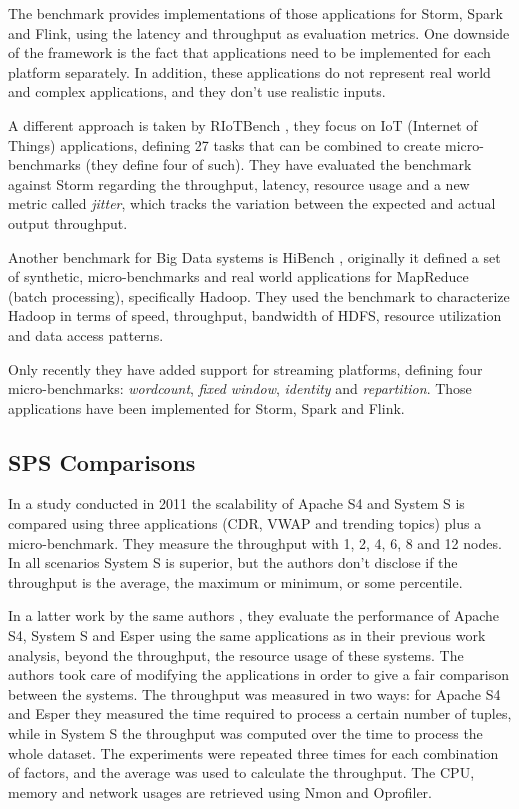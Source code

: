 \documentclass[ppgc,diss,english]{iiufrgs}
\begin{document}
The benchmark provides implementations of those applications for Storm, Spark and Flink, using the latency and throughput as evaluation metrics. One downside of the framework is the fact that applications need to be implemented for each platform separately. In addition, these applications do not represent real world and complex applications, and they don't use realistic inputs.



A different approach is taken by RIoTBench \cite{shukla2017riotbench}, they focus on IoT (Internet of Things) applications, defining 27 tasks that can be combined to create micro-benchmarks (they define four of such). They have evaluated the benchmark against Storm regarding the throughput, latency, resource usage and a new metric called \textit{jitter}, which tracks the variation between the expected and actual output throughput.



Another benchmark for Big Data systems is HiBench \cite{huang2010hibench}, originally it defined a set of synthetic, micro-benchmarks and real world applications for MapReduce (batch processing), specifically Hadoop. They used the benchmark to characterize Hadoop in terms of speed, throughput, bandwidth of HDFS, resource utilization and data access patterns.

Only recently they have added support for streaming platforms, defining four micro-benchmarks: \textit{wordcount}, \textit{fixed window}, \textit{identity} and \textit{repartition}. Those applications have been implemented for Storm, Spark and Flink.


\subsection{SPS Comparisons}

In a study conducted in 2011 \cite{dayarathna2011performance} the scalability of Apache S4 and System S is compared using three applications (CDR, VWAP and trending topics) plus a micro-benchmark. They measure the throughput with 1, 2, 4, 6, 8 and 12 nodes. In all scenarios System S is superior, but the authors don't disclose if the throughput is the average, the maximum or minimum, or some percentile.

In a latter work by the same authors \cite{dayarathna2013performance}, they evaluate the performance of Apache S4, System S and Esper using the same applications as in their previous work analysis, beyond the throughput, the resource usage of these systems. The authors took care of modifying the applications in order to give a fair comparison between the systems. The throughput was measured in two ways: for Apache S4 and Esper they measured the time required to process a certain number of tuples, while in System S the throughput was computed over the time to process the whole dataset. The experiments were repeated three times for each combination of factors, and the average was used to calculate the throughput. The CPU, memory and network usages are retrieved using Nmon and Oprofiler.
\end{document}
